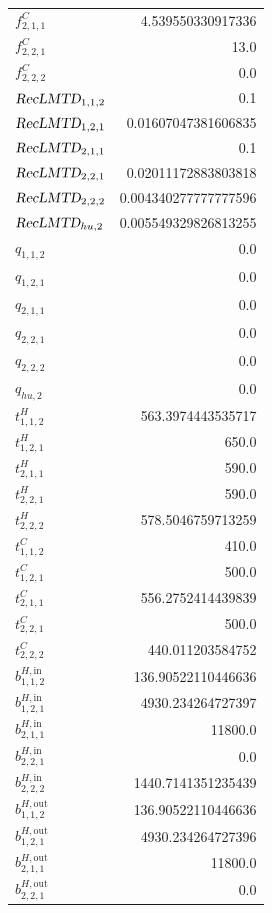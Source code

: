 \documentclass{article}%
\begin{document}
\begin{multicols*}{3}
\begin{supertabular}{lr}
	$f_{2,1,1}^{C}$ & 4.539550330917336 \\%
	$f_{2,2,1}^{C}$ & 13.0 \\%
	$f_{2,2,2}^{C}$ & 0.0 \\%
	$\textsl{RecLMTD}_{1,1,2}$ & 0.1 \\%
	$\textsl{RecLMTD}_{1,2,1}$ & 0.01607047381606835 \\%
	$\textsl{RecLMTD}_{2,1,1}$ & 0.1 \\%
	$\textsl{RecLMTD}_{2,2,1}$ & 0.02011172883803818 \\%
	$\textsl{RecLMTD}_{2,2,2}$ & 0.004340277777777596 \\%
	$\textsl{RecLMTD}_{hu,2}$ & 0.005549329826813255 \\%
	$q_{1,1,2}$ & 0.0 \\%
	$q_{1,2,1}$ & 0.0 \\%
	$q_{2,1,1}$ & 0.0 \\%
	$q_{2,2,1}$ & 0.0 \\%
	$q_{2,2,2}$ & 0.0 \\%
	$q_{hu,2}$ & 0.0 \\%
	$t_{1,1,2}^{H}$ & 563.3974443535717 \\%
	$t_{1,2,1}^{H}$ & 650.0 \\%
	$t_{2,1,1}^{H}$ & 590.0 \\%
	$t_{2,2,1}^{H}$ & 590.0 \\%
	$t_{2,2,2}^{H}$ & 578.5046759713259 \\%
	$t_{1,1,2}^{C}$ & 410.0 \\%
	$t_{1,2,1}^{C}$ & 500.0 \\%
	$t_{2,1,1}^{C}$ & 556.2752414439839 \\%
	$t_{2,2,1}^{C}$ & 500.0 \\%
	$t_{2,2,2}^{C}$ & 440.011203584752 \\%
	$b_{1,1,2}^{H,\text{in}}$ & 136.90522110446636 \\%
	$b_{1,2,1}^{H,\text{in}}$ & 4930.234264727397 \\%
	$b_{2,1,1}^{H,\text{in}}$ & 11800.0 \\%
	$b_{2,2,1}^{H,\text{in}}$ & 0.0 \\%
	$b_{2,2,2}^{H,\text{in}}$ & 1440.7141351235439 \\%
	$b_{1,1,2}^{H,\text{out}}$ & 136.90522110446636 \\%
	$b_{1,2,1}^{H,\text{out}}$ & 4930.234264727396 \\%
	$b_{2,1,1}^{H,\text{out}}$ & 11800.0 \\%
	$b_{2,2,1}^{H,\text{out}}$ & 0.0 \\%

\end{supertabular}
\end{multicols*}
\end{document}
